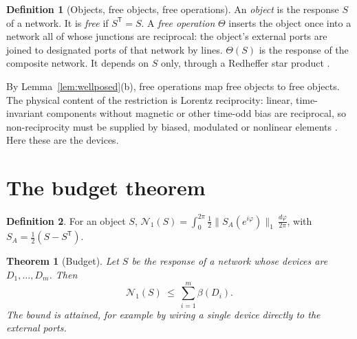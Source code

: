 \documentclass[11pt]{article}
\newtheorem{theorem}{Theorem}
\theoremstyle{definition}
\newtheorem{definition}{Definition}
\theoremstyle{remark}
\newcommand{\NN}{\mathcal N_1}
\newcommand{\T}{\mathsf T}
\begin{document}
\begin{definition}[Objects, free objects, free operations]\label{def:rt}
An \emph{object} is the response $S$ of a network. It is \emph{free} if $S^\T=S$. A \emph{free operation} $\Theta$ inserts the object once into a network all of whose junctions are reciprocal: the object's external ports are joined to designated ports of that network by lines. $\Theta(S)$ is the response of the composite network. It depends on $S$ only, through a Redheffer star product \cite{Red60}.
\end{definition}

By Lemma~\ref{lem:wellposed}(b), free operations map free objects to free objects. The physical content of the restriction is Lorentz reciprocity: linear, time-invariant components without magnetic or other time-odd bias are reciprocal, so non-reciprocity must be supplied by biased, modulated or nonlinear elements \cite{Jal13,Cal18}. Here these are the devices.

\section{The budget theorem}

\begin{definition}
For an object $S$, $\displaystyle \NN(S)=\int_0^{2\pi}\tfrac12\|S_A(e^{i\varphi})\|_1\,\frac{d\varphi}{2\pi}$, with $S_A=\frac12(S-S^\T)$.
\end{definition}

\begin{theorem}[Budget]\label{thm:budget}
Let $S$ be the response of a network whose devices are $D_1,\dots,D_m$. Then
\[
\NN(S)\ \le\ \sum_{i=1}^m\beta(D_i).
\]
The bound is attained, for example by wiring a single device directly to the external ports.
\end{theorem}
\end{document}
